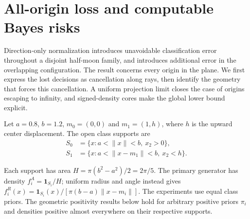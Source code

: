 \section{All-origin loss and computable Bayes risks}
\label{sec:origin-theory}

Direction-only normalization introduces unavoidable classification error throughout a disjoint half-moon family, and introduces additional error in the overlapping configuration. The result concerns every origin in the plane. We first express the lost decisions as cancellation along rays, then identify the geometry that forces this cancellation. A uniform projection limit closes the case of origins escaping to infinity, and signed-density cores make the global lower bound explicit. 

\begin{samepage}
Let $a=0.8$, $b=1.2$, $m_0=(0,0)$ and $m_1=(1,h)$, where $h$ is the upward center displacement. The open class supports are
\begin{align}
 S_0&=\{x:a<\|x\|<b,\ x_2>0\},\nonumber\\
 S_1&=\{x:a<\|x-m_1\|<b,\ x_2<h\}.
 \label{eq:halfmoon-supports}
\end{align}
\end{samepage}
Each support has area $H=\pi(b^2-a^2)/2=2\pi/5$. The primary generator has density $f_i^A=\mathbf1_{S_i}/H$; uniform radius and angle instead gives $f_i^R(x)=\mathbf1_{S_i}(x)/[\pi(b-a)\|x-m_i\|]$. The experiments use equal class priors. The geometric positivity results below hold for arbitrary positive priors $\pi_i$ and densities positive almost everywhere on their respective supports.

